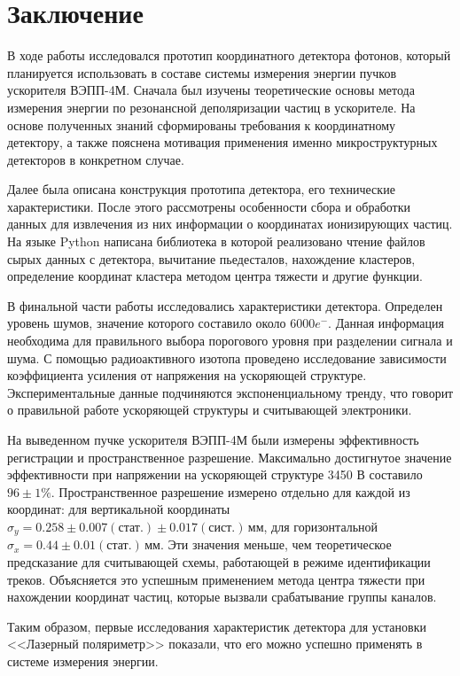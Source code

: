 \chapter*{Заключение}
В ходе работы исследовался прототип координатного детектора фотонов, который планируется использовать в составе системы измерения энергии пучков ускорителя ВЭПП-4М. Сначала был изучены теоретические основы метода измерения энергии по резонансной деполяризации частиц в ускорителе. На основе полученных знаний сформированы требования к координатному детектору, а также  пояснена мотивация применения именно микроструктурных детекторов в конкретном случае. 
\par Далее была описана конструкция прототипа детектора, его технические характеристики. После этого рассмотрены особенности сбора и обработки данных для извлечения из них информации о координатах ионизирующих частиц. На языке Python написана библиотека в которой реализовано чтение файлов сырых данных с детектора, вычитание пьедесталов, нахождение кластеров, определение координат кластера методом центра тяжести и другие функции. 
\par В финальной части работы исследовались характеристики детектора. Определен уровень шумов, значение которого составило около $6000 e^-$. Данная информация необходима для правильного выбора порогового уровня при разделении сигнала и шума. С помощью радиоактивного изотопа проведено исследование зависимости коэффициента усиления от напряжения на ускоряющей структуре. Экспериментальные данные подчиняются экспоненциальному тренду, что говорит о правильной работе ускоряющей структуры и считывающей электроники. 
\par На выведенном пучке ускорителя ВЭПП-4М были измерены эффективность регистрации и пространственное разрешение. Максимально достигнутое значение эффективности при напряжении на ускоряющей структуре 3450 В составило $96 \pm 1\%$. Пространственное разрешение измерено отдельно для каждой из координат: для вертикальной координаты $\sigma_y = 0.258\pm0.007(\text{стат.})\pm0.017(\text{сист.})$\,мм, для горизонтальной $\sigma_x = 0.44\pm0.01(\text{стат.})$\,мм. Эти значения меньше, чем теоретическое предсказание для считывающей схемы, работающей в режиме идентификации треков. Объясняется это успешным применением метода центра тяжести при нахождении координат частиц, которые вызвали срабатывание группы каналов. 
\par Таким образом, первые исследования характеристик детектора для установки <<Лазерный поляриметр>> показали, что его можно успешно применять в системе измерения энергии. 